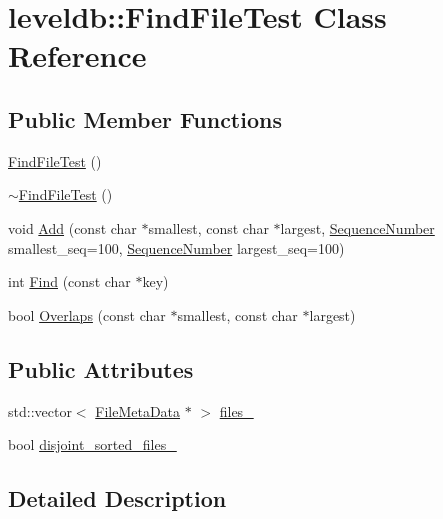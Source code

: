 \hypertarget{classleveldb_1_1_find_file_test}{}\section{leveldb\+:\+:Find\+File\+Test Class Reference}
\label{classleveldb_1_1_find_file_test}
\subsection*{Public Member Functions}
\begin{DoxyCompactItemize}
\item 
\hyperlink{classleveldb_1_1_find_file_test_a79d3a7171588c32598d46610563709e8}{Find\+File\+Test} ()
\item 
\hyperlink{classleveldb_1_1_find_file_test_a147a326f046217d4a6cf737d3346bde7}{$\sim$\+Find\+File\+Test} ()
\item 
void \hyperlink{classleveldb_1_1_find_file_test_a7daf932b5d9881438c6edb5f7881901c}{Add} (const char $\ast$smallest, const char $\ast$largest, \hyperlink{namespaceleveldb_a5481ededd221c36d652c371249f869fa}{Sequence\+Number} smallest\+\_\+seq=100, \hyperlink{namespaceleveldb_a5481ededd221c36d652c371249f869fa}{Sequence\+Number} largest\+\_\+seq=100)
\item 
int \hyperlink{classleveldb_1_1_find_file_test_a233fd8c1e1764f2572e03d28b1f58ae0}{Find} (const char $\ast$key)
\item 
bool \hyperlink{classleveldb_1_1_find_file_test_a617e51dc2e6acbe7d5bc6d0a7224ac51}{Overlaps} (const char $\ast$smallest, const char $\ast$largest)
\end{DoxyCompactItemize}
\subsection*{Public Attributes}
\begin{DoxyCompactItemize}
\item 
std\+::vector$<$ \hyperlink{structleveldb_1_1_file_meta_data}{File\+Meta\+Data} $\ast$ $>$ \hyperlink{classleveldb_1_1_find_file_test_a53b61e6b01283c235fae219013b0e2c7}{files\+\_\+}
\item 
bool \hyperlink{classleveldb_1_1_find_file_test_acf50512be17b9a3cd96388a8c837b8e0}{disjoint\+\_\+sorted\+\_\+files\+\_\+}
\end{DoxyCompactItemize}


\subsection{Detailed Description}


